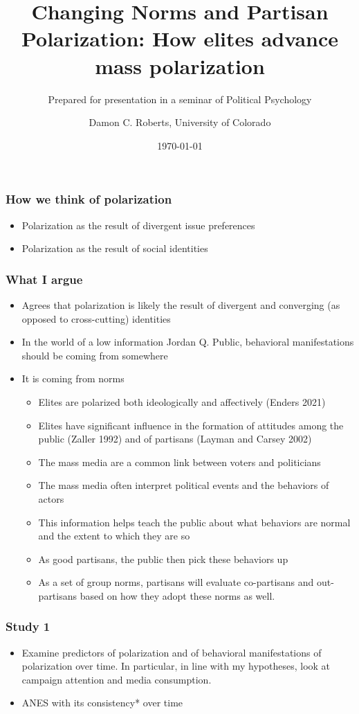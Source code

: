 \documentclass[aspectratio=1610]{beamer}
\title{Changing Norms and Partisan Polarization: How elites advance mass polarization}
\subtitle{Prepared for presentation in a seminar of Political Psychology}
\date{\today}
\author[\copyright\ Roberts $2021$]{Damon C. Roberts, University of Colorado}
\begin{document}
	\begin{frame}
		\maketitle	
	\end{frame}
	\begin{frame}
		\frametitle{How we think of polarization}
		\begin{itemize}
			\item Polarization as the result of divergent issue preferences
			\item Polarization as the result of social identities
		\end{itemize}
	\end{frame}
	\begin{frame}[allowframebreaks]
		\frametitle{What I argue}
		\begin{itemize}
			\item Agrees that polarization is likely the result of divergent and converging (as opposed to cross-cutting) identities
			\item In the world of a low information Jordan Q. Public, behavioral manifestations should be coming from somewhere
			\item It is coming from norms
			\begin{itemize}
				\item Elites are polarized both ideologically and affectively (Enders 2021)
				\item Elites have significant influence in the formation of attitudes among the public (Zaller 1992) and of partisans (Layman and Carsey 2002)
				\item The mass media are a common link between voters and politicians
				\item The mass media often interpret political events and the behaviors of actors
				\item This information helps teach the public about what behaviors are normal and the extent to which they are so
				\item As good partisans, the public then pick these behaviors up
				\item As a set of group norms, partisans will evaluate co-partisans and out-partisans based on how they adopt these norms as well.
			\end{itemize}
		\end{itemize}
	\end{frame}
	\begin{frame}
		\frametitle{Study 1}
		\begin{itemize}
			\item Examine predictors of polarization and of behavioral manifestations of polarization over time. In particular, in line with my hypotheses, look at campaign attention and media consumption. 
			\item ANES with its consistency* over time
		\end{itemize}
	\end{frame}
\end{document}
